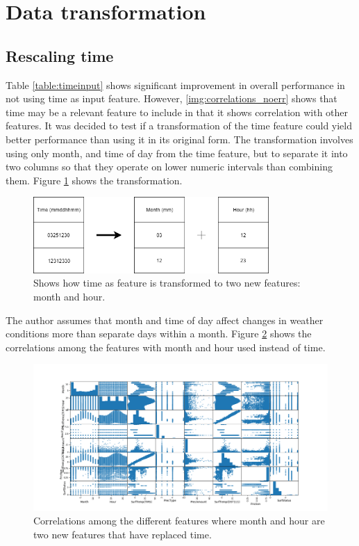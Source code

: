 \section{Data transformation} \label{sec:transformation}

	\subsection{Rescaling time}

	Table \ref{table:timeinput} shows significant improvement in overall performance in not using time as input feature. However,  \ref{img:correlations_noerr} shows that time may be a relevant feature to include in that it shows correlation with other features. It was decided to test if a transformation of the time feature could yield better performance than using it in its original form. The transformation involves using only month, and time of day from the time feature, but to separate it into two columns so that they operate on lower numeric intervals than combining them. Figure \ref{img:transformation} shows the transformation. 

\begin{figure}[H] 
	\centering
	\includegraphics[width=0.8\textwidth]{media/transformation_time.png}
	\caption{Shows how time as feature is transformed to two new features: month and hour.}
	\label{img:transformation}
\end{figure}

	The author assumes that month and time of day affect changes in weather conditions more than separate days within a month. Figure \ref{img:correlations_featureengi} shows the correlations among the features with month and hour used instead of time. 

\begin{figure}[H] 
	\centering
	\includegraphics[width=1\textwidth]{media/correlations_featureengi.png}
	\caption{Correlations among the different features where month and hour are two new features that have replaced time. }
	\label{img:correlations_featureengi}
\end{figure}

